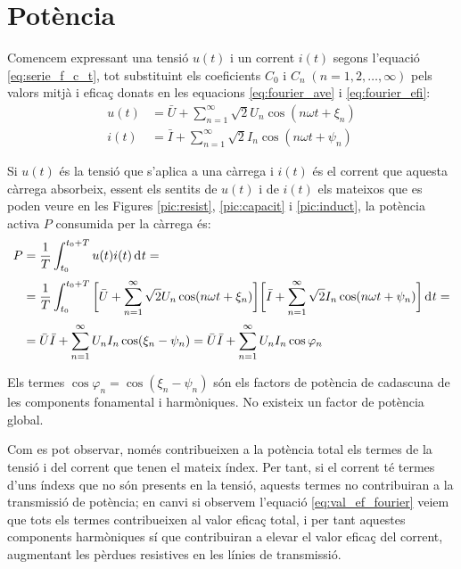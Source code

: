 \section{Potència}

Comencem expressant una tensió $u(t)$ i un corrent $i(t)$
 segons l'equació \eqref{eq:serie_f_c_t}, tot substituint els
 coeficients $C_0$ i $C_n \;(n=1,2,\ldots,\infty)$ pels valors mitjà i eficaç
 donats en les equacions \eqref{eq:fourier_ave} i \eqref{eq:fourier_efi}:
 \begin{align}
    u(t)  &= \bar{U} + \sum_{n=1}^\infty \sqrt{2} U_n \cos (n \omega t +
    \xi_n)\\[0.5ex]
    i(t)  &= \bar{I} + \sum_{n=1}^\infty \sqrt{2} I_n \cos (n \omega t + \psi_n)
 \end{align}

Si  $u(t)$ és la tensió que s'aplica a una càrrega i $i(t)$ és el
corrent que aquesta càrrega absorbeix, essent els sentits de $u(t)$
i de $i(t)$ els mateixos que es poden veure en les Figures
\ref{pic:resist}, \ref{pic:capacit} i \ref{pic:induct}, la potència
activa $P$ consumida per la càrrega és:
\begin{equation}\begin{split}
    P &= \frac{1}{T} \int_{t_0}^{t_0+T} u(t) i(t) \diff t =
    \\[0.5ex]
     &= \frac{1}{T} \int_{t_0}^{t_0+T} \bigg[\bar{U} + \sum_{n=1}^\infty
    \sqrt{2} U_n \cos (n \omega t + \xi_n) \bigg]
    \bigg[\bar{I} + \sum_{n=1}^\infty \sqrt{2} I_n
    \cos (n \omega t + \psi_n)\bigg] \diff t=\\[0.5ex]
    &=\bar{U} \bar{I} + \sum_{n=1}^\infty U_n I_n
    \cos(\xi_n-\psi_n) = \bar{U} \bar{I} + \sum_{n=1}^\infty U_n I_n
    \cos \varphi_n \label{eq:pot_fu}
\end{split}\end{equation}

Els termes $\cos \varphi_n=\cos (\xi_n-\psi_n)$ són els factors de
potència de cadascuna de les components fonamental i harmòniques. No
existeix un factor de potència global.

 Com es pot observar, només contribueixen a la potència
total els termes de la tensió i del corrent que tenen el mateix
índex. Per tant, si el corrent té termes d'uns índexs que no són
presents en la tensió, aquests termes no contribuiran a la
transmissió de  potència; en canvi si observem l'equació
\eqref{eq:val_ef_fourier} veiem que tots els termes contribueixen al
valor eficaç total, i per tant aquestes components harmòniques sí que
contribuiran a elevar el valor eficaç del corrent, augmentant
 les pèrdues resistives en les línies de transmissió.

